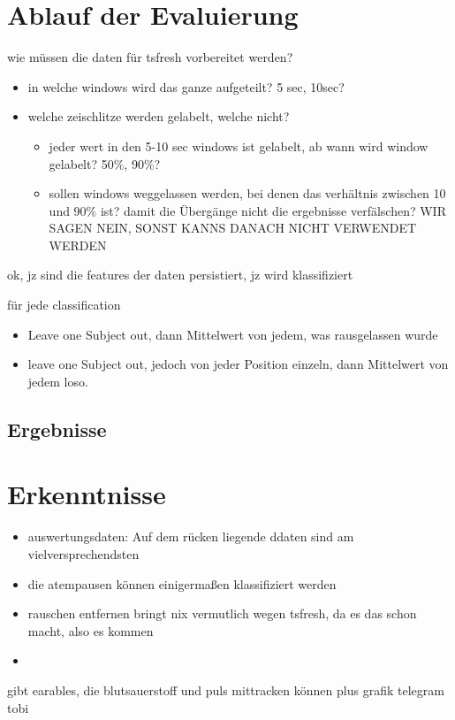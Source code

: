 \section{Ablauf der Evaluierung}
wie müssen die daten für tsfresh vorbereitet werden?
\begin{itemize}
    \item in welche windows wird das ganze aufgeteilt? 5 sec, 10sec?
    \item welche zeischlitze werden gelabelt, welche nicht?
    \begin{itemize}
        \item jeder wert in den 5-10 sec windows ist gelabelt, ab wann wird window gelabelt? 50\%, 90\%?
        \item sollen windows weggelassen werden, bei denen das verhältnis zwischen 10 und 90\% ist? damit die Übergänge nicht die ergebnisse verfälschen? WIR SAGEN NEIN, SONST KANNS DANACH NICHT VERWENDET WERDEN
    \end{itemize}
\end{itemize}
ok, jz sind die features der daten persistiert, jz wird klassifiziert

für jede classification
\begin{itemize}
    \item Leave one Subject out, dann Mittelwert von jedem, was rausgelassen wurde
    \item leave one Subject out, jedoch von jeder Position einzeln, dann Mittelwert von jedem loso.
\end{itemize}

\subsection{Ergebnisse}

\section{Erkenntnisse}
\begin{itemize}
    \item auswertungsdaten: Auf dem rücken liegende ddaten sind am vielversprechendsten
    \item die atempausen können einigermaßen klassifiziert werden
    \item rauschen entfernen bringt nix vermutlich wegen tsfresh, da es das schon macht, also es kommen
    \item 
\end{itemize}


gibt earables, die blutsauerstoff und puls mittracken können
plus grafik telegram tobi